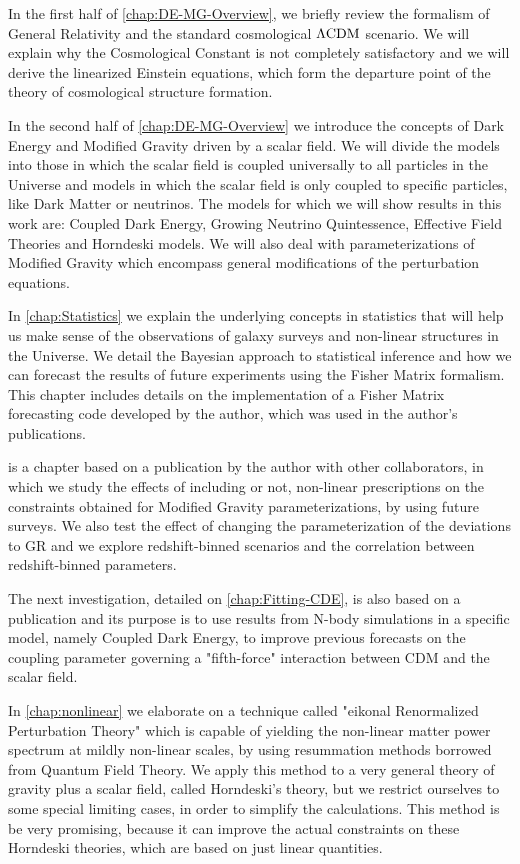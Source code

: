 In the first half of \cref{chap:DE-MG-Overview}, 
we briefly review the formalism of General Relativity and
the standard cosmological $\Lambda\mathrm{CDM}$ scenario. We will explain why the Cosmological 
Constant is not completely satisfactory and we will derive the linearized
Einstein equations, which form the departure point of the theory of 
cosmological structure formation.

In the second half of \cref{chap:DE-MG-Overview} we introduce the concepts of Dark Energy 
and Modified Gravity driven by a scalar field. We will divide the models into those in which the
scalar field is coupled universally to all particles in the Universe and models in which the scalar field is only coupled to specific particles, like Dark Matter or neutrinos. The models for which we will show results in this work are: Coupled Dark Energy, Growing Neutrino Quintessence, Effective Field Theories and Horndeski models. 
We will also deal with parameterizations of Modified Gravity which encompass
general modifications of the perturbation equations.

In \cref{chap:Statistics} we explain the underlying concepts in statistics that will help us
make sense of the observations of galaxy surveys and non-linear structures in the Universe.
We detail the Bayesian approach to statistical inference and how we can forecast the results of future 
experiments using the Fisher Matrix formalism. This chapter includes details on the implementation
of a Fisher Matrix forecasting code developed by the author, which was used in the author's publications.

 is a chapter based on a publication by the author with other collaborators, in which we study the effects of including or not, non-linear prescriptions on the constraints obtained for Modified Gravity parameterizations, by using future surveys. We also test the effect of changing the parameterization of the deviations to GR and we explore redshift-binned scenarios and the correlation between redshift-binned parameters.

The next investigation, detailed on \cref{chap:Fitting-CDE}, is also based on a publication and its purpose 
is to use results from N-body simulations in a specific model, namely Coupled Dark Energy, to improve 
previous forecasts on the coupling parameter governing a "fifth-force" interaction between CDM and 
the scalar field.

In \cref{chap:nonlinear} we elaborate on a technique called "eikonal Renormalized Perturbation Theory"
which is capable of yielding the non-linear matter power spectrum at mildly non-linear scales, by using resummation methods borrowed from Quantum Field Theory. 
We apply this method to a very general theory of gravity plus a scalar field, called Horndeski's theory, but we restrict ourselves to some special limiting cases, in order to  simplify the calculations. This  method
is be very promising, because it can improve the actual constraints on these Horndeski theories, which are based on just linear quantities.

